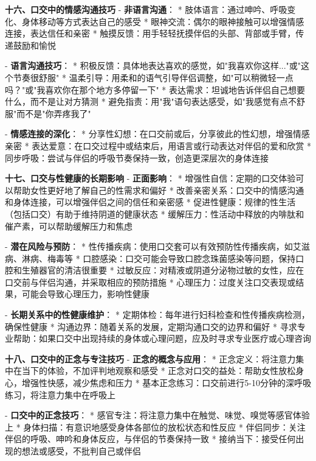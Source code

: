 \begin{enumerate}
  \textbf{十六、口交中的情感沟通技巧}
  - \textbf{非语言沟通}：
    * 肢体语言：通过呻吟、呼吸变化、身体移动等方式表达自己的感受
    * 眼神交流：偶尔的眼神接触可以增强情感连接，表达信任和亲密
    * 触摸反馈：用手轻轻抚摸伴侣的头部、背部或手臂，传递鼓励和愉悦

  - \textbf{语言沟通技巧}：
    * 积极反馈：具体地表达喜欢的感觉，如"我喜欢你这样..."或"这个节奏很舒服"
    * 温柔引导：用柔和的语气引导伴侣调整，如"可以稍微轻一点吗？"或"我喜欢你在那个地方多停留一下"
    * 表达需求：坦诚地告诉伴侣自己想要什么，而不是让对方猜测
    * 避免指责：用"我"语句表达感受，如"我感觉有点不舒服"而不是"你弄疼我了"

  - \textbf{情感连接的深化}：
    * 分享性幻想：在口交前或后，分享彼此的性幻想，增强情感亲密
    * 表达爱意：在口交过程中或结束后，用语言或行动表达对伴侣的爱和欣赏
    * 同步呼吸：尝试与伴侣的呼吸节奏保持一致，创造更深层次的身体连接

  \textbf{十七、口交与性健康的长期影响}
  - \textbf{正面影响}：
    * 增强性自信：定期的口交体验可以帮助女性更好地了解自己的性需求和偏好
    * 改善亲密关系：口交中的情感沟通和身体连接，可以增强伴侣之间的信任和亲密感
    * 促进性健康：规律的性生活（包括口交）有助于维持阴道的健康状态
    * 缓解压力：性活动中释放的内啡肽和催产素，可以帮助缓解压力和焦虑

  - \textbf{潜在风险与预防}：
    * 性传播疾病：使用口交套可以有效预防性传播疾病，如艾滋病、淋病、梅毒等
    * 口腔感染：口交可能会导致口腔念珠菌感染等问题，保持口腔和生殖器官的清洁很重要
    * 过敏反应：对精液或阴道分泌物过敏的女性，应在口交前与伴侣沟通，并采取相应的预防措施
    * 心理压力：过度关注口交表现或结果，可能会导致心理压力，影响性健康

  - \textbf{长期关系中的性健康维护}：
    * 定期体检：每年进行妇科检查和性传播疾病检测，确保性健康
    * 沟通边界：随着关系的发展，定期沟通口交的边界和偏好
    * 寻求专业帮助：如果口交中出现持续的身体或心理问题，应及时寻求专业医疗或心理咨询

  \textbf{十八、口交中的正念与专注技巧}
  - \textbf{正念的概念与应用}：
    * 正念定义：将注意力集中在当下的体验，不加评判地观察和感受
    * 正念对口交的益处：帮助女性放松身心，增强性快感，减少焦虑和压力
    * 基本正念练习：口交前进行5-10分钟的深呼吸练习，将注意力集中在呼吸上

  - \textbf{口交中的正念技巧}：
    * 感官专注：将注意力集中在触觉、味觉、嗅觉等感官体验上
    * 身体扫描：有意识地感受身体各部位的放松状态和性反应
    * 伴侣同步：关注伴侣的呼吸、呻吟和身体反应，与伴侣的节奏保持一致
    * 接纳当下：接受任何出现的想法或感受，不批判自己或伴侣


\end{enumerate}
